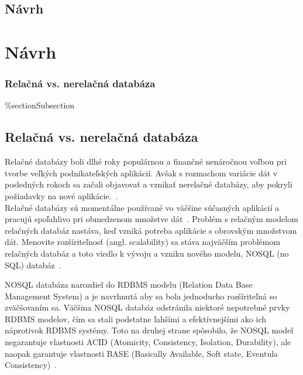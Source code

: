 \newpage
%
%
{
	\section{Návrh}
}
{
	\chapter{Návrh}
}
 
%
%
{
	\subsection{Relačná vs. nerelačná databáza}
}
{
	\%section{Subsection}
	\section{Relačná vs. nerelačná databáza}
}
\label{subsection:relation_vs_document_db}
Relačné databázy boli dlhé roky populárnou a finančné nenáročnou voľbou pri tvorbe veľkých podnikateľských aplikácií. Avšak s rozmachom variácie dát v posledných rokoch sa začali objavovať a vznikať nerelačné databázy, aby pokryli požiadavky na nové aplikácie.~\cite{MongoDBvsMySQLCompared}.
\\

Relačné databázy sú momentálne používané vo väčšine súčasných aplikácií a pracujú spoľahlivo pri obmedzenom množstve dát~\cite{MongoDBvsMySQL2015}. Problém s relačným modelom relačných databáz nastáva, keď vzniká potreba aplikácie s obrovským množstvom dát. Menovite rozšíriteľnosť (angl. scalability) sa stáva najväčším problémom relačných databáz a toto viedlo k vývoju a vzniku nového modelu, NOSQL (no SQL) databáz~\cite{NoSQLDBvsRealtionDB}.

NOSQL databáza narozdiel do RDBMS modelu (Relation Data Base Management System) a je
navrhnutá aby sa bola jednoducho rozšíriteľná so zväčšovaním sa. Väčšina NOSQL databáz odstránila niektoré nepotrebné prvky RDBMS modelov, čím sa stali podstatne ľahšími a efektívnejšími ako ich náprotivok RDBMS systémy. Toto na druhej strane spôsobilo, že NOSQL model negarantuje vlastnosti ACID (Atomicity, Consistency, Isolation, Durability), ale naopak garantuje vlastnosti BASE (Basically Available, Soft state, Eventula Consistency)~\cite{NoSQLDBvsRealtionDB}.

